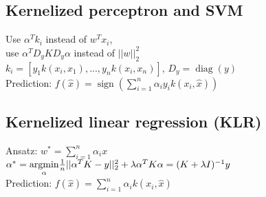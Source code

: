 \subsection*{Kernelized perceptron and SVM}
Use $\alpha^T k_i$ instead of $w^T x_i$,\\
use $\alpha^T D_y K D_y \alpha$ instead of $||w||_2^2$\\ 
$k_i=[y_1 k(x_i,x_1), ..., y_n k(x_i,x_n)]$, $D_y = \operatorname{diag}(y)$\\
Prediction: $f(\hat{x}) = \operatorname{sign}(\sum_{i=1}^n \alpha_i y_i k(x_i, \hat{x}))$

\subsection*{Kernelized linear regression (KLR)}
Ansatz: $w^*=\sum_{i = 1}^n \alpha_i x$\\
$\alpha^*= \underset{\alpha}{\operatorname{argmin}}\frac{1}{n} ||\alpha^T K - y||_2^2 + \lambda \alpha^T K \alpha \\= (K+\lambda I)^{-1} y$\\
Prediction: $f(\hat{x}) = \sum \limits_{i=1}^n \alpha_i k(x_i,\hat{x})$